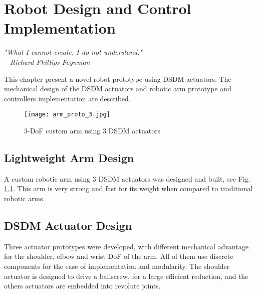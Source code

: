 \chapter{Robot Design and Control Implementation}
\label{sec:ExperimentalValidation}

{
\begin{flushright}
\textit{"What I cannot create, I do not understand."} \\ 
\emph{-- Richard Phillips Feynman}
\end{flushright}
}
\vspace{10pt}



This chapter present a novel robot prototype using DSDM actuators. The mechanical design of the DSDM actuators and robotic arm prototype and controllers implementation are described.

\begin{figure}[htp]
	\centering
		\texttt{[image: arm\_proto\_3.jpg]}
	\caption{3-DoF custom arm using 3 DSDM actuators}
	\label{fig:dsdm_arm}
\end{figure}


\section{Lightweight Arm Design}
\label{sec:DSDMArm}

A custom robotic arm using 3 DSDM actuators was designed and built, see Fig. \ref{fig:dsdm_arm}. This arm is very strong and fast for its weight when compared to traditional robotic arms. 

\section{DSDM Actuator Design}
\label{sec:ActuatorDesign}
 
Three actuator prototypes were developed, with different mechanical advantage for the shoulder, elbow and wrist DoF of the arm. All of them use discrete components for the ease of implementation and modularity. The shoulder actuator is designed to drive a ballscrew, for a large efficient reduction, and the others actuators are embedded into revolute joints. 


